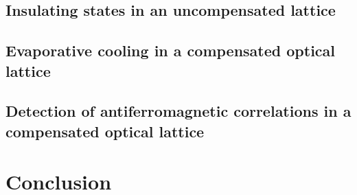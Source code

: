 \documentclass[oneside,11pt]{memoir}
\begin{document}
\section{Insulating states in an uncompensated lattice} 
\section{Evaporative cooling in a compensated optical lattice} 
\section{Detection of antiferromagnetic correlations in a compensated optical lattice}

\chapter{Conclusion} 
\end{document}
